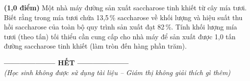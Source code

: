 \documentclass[11pt,a4paper]{article}
\begin{document}
\begin{ex}
\textbf{(1,0 điểm)} Một nhà máy đường sản xuất saccharose tinh khiết từ cây mía tươi. Biết rằng trong mía tươi chứa 13,5\,\% saccharose về khối lượng và hiệu suất thu hồi saccharose của toàn bộ quy trình sản xuất đạt 82\,\%. Tính khối lượng mía tươi (theo tấn) tối thiểu cần cung cấp cho nhà máy để sản xuất được 1,0 tấn đường saccharose tinh khiết (làm tròn đến hàng phần trăm).



\end{ex}

\vspace{8pt}
\begin{center}
\textbf{-------------------- HẾT --------------------}\\
\textit{\small (Học sinh không được sử dụng tài liệu -- Giám thị không giải thích gì thêm)}
\end{center}
\end{document}
